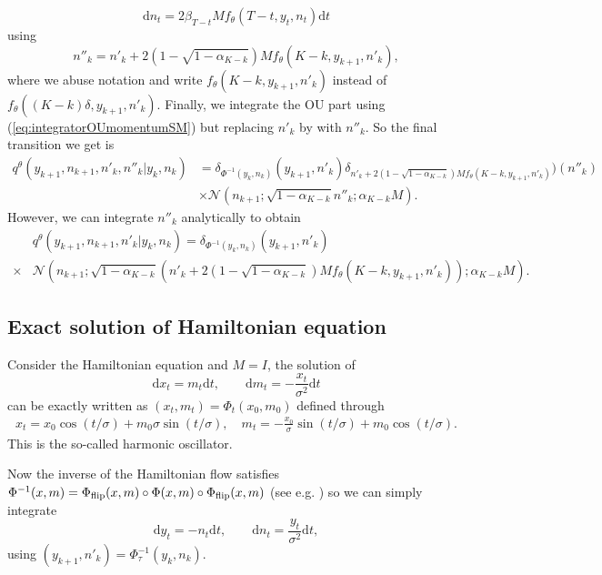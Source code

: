 \documentclass{article} %
\begin{document}
\begin{equation}
\mathrm{d}n_t=2\beta_{T-t}M f_{\theta}(T-t,y_t,n_t)\mathrm{d}t
\end{equation}
using 
\begin{equation}
    n''_k=n'_k+2 (1-\sqrt{1-\alpha_{K-k}}) M f_{\theta}(K-k,y_{k+1},n'_k),
\end{equation}
where we abuse notation and write $f_{\theta}(K-k,y_{k+1},n'_k)$ instead of $f_{\theta}((K-k)\delta,y_{k+1},n'_k)$.
Finally, we integrate the OU part using (\ref{eq:integratorOUmomentumSM}) but replacing $n'_k$ by with $n''_k$. So the final transition we get is 
\begin{align*}
    q^\theta(y_{k+1},n_{k+1},n'_k,n''_k|y_k,n_k)&=\delta_{\Phi^{-1}(y_k,n_k)}(y_{k+1},n'_k)\delta_{n'_k+2 (1-\sqrt{1-\alpha_{K-k}})M f_{\theta}(K-k,y_{k+1},n'_k)})(n''_k)\\
    &\times \mathcal{N}(n_{k+1};\sqrt{1-\alpha_{K-k}}n''_k;\alpha_{K-k}M).
\end{align*}
However, we can integrate $n''_k$ analytically to obtain
\begin{align}\label{eq:transqthetaunderdamped}
    &q^\theta(y_{k+1},n_{k+1},n'_k|y_k,n_k)=\delta_{\Phi^{-1}(y_k,n_k)}(y_{k+1},n'_k) \nonumber\\
    \times&\mathcal{N}(n_{k+1};\sqrt{1-\alpha_{K-k}}(n'_k+2(1-\sqrt{1-\alpha_{K-k}})M f_{\theta}(K-k,y_{k+1},n'_k));\alpha_{K-k}M).
\end{align}


\subsection{Exact solution of Hamiltonian equation}\label{sec:exactHamiltonianequation}
Consider the Hamiltonian equation and $M=I$, the solution of
\begin{equation}
\mathrm{d}x_t=m_t\mathrm{d}t,\qquad \mathrm{d}m_t=-\frac{x_t}{\sigma^2}\mathrm{d}t
\end{equation}
can be exactly written as $(x_t,m_t)=\Phi_t(x_0,m_0)$ defined through
\begin{align}
    x_t=x_0 \cos(t/\sigma)+m_0 \sigma \sin(t/\sigma),\quad 
    m_t=-\frac{x_0}{\sigma} \sin(t/\sigma)+m_0 \cos(t/\sigma).
\end{align}
This is the so-called harmonic oscillator.

Now the inverse of the Hamiltonian flow satisfies $\Phi^{-1}(x,m)=\Phi_{\textup{flip}}(x,m)\circ\Phi(x,m)\circ\Phi_{\textup{flip}}(x,m)$ (see e.g. \cite{leimkuhler2016molecular})
so we can simply integrate
\begin{equation}
\mathrm{d}y_t=-n_t\mathrm{d}t,\qquad \mathrm{d}n_t=\frac{y_t}{\sigma^2}\mathrm{d}t,
\end{equation}
using $(y_{k+1},n'_{k})=\Phi_{\tau}^{-1}(y_k,n_k)$.
\end{document}
